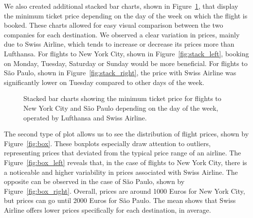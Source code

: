 We also created additional stacked bar charts, shown in Figure~\ref{fig:stacked}, that display the minimum ticket price depending on the day of the week on which the flight is booked.
These charts allowed for easy visual comparison between the two companies for each destination.
We observed a clear variation in prices, mainly due to Swiss Airline, which tends to increase or decrease its prices more than Lufthansa.
For flights to New York City, shown in Figure~\ref{fig:stack_left}, booking on Monday, Tuesday, Saturday or Sunday would be more beneficial.
For flights to São Paulo, shown in Figure~\ref{fig:stack_right}, the price with Swiss Airline was significantly lower on Tuesday compared to other days of the week.
\begin{figure}
    \centering
    \caption{Stacked bar charts showing the minimum ticket price for flights to New York City and São Paulo depending on the day of the week, operated by Lufthansa and Swiss Airline.}
    \label{fig:stacked}
\end{figure}

The second type of plot allows us to see the distribution of flight prices, shown by Figure~\ref{fig:box}.
These boxplots especially draw attention to outliers, representing prices that deviated from the typical price range of an airline.
The Figure~\ref{fig:box_left} reveals that, in the case of flights to New York City, there is a noticeable and higher variability in prices associated with Swiss Airline.
The opposite can be observed in the case of São Paulo, shown by Figure~\ref{fig:box_right}. Overall, prices are around 1000 Euros for New York City, but prices can go until 2000 Euros for São Paulo.
The mean shows that Swiss Airline offers lower prices specifically for each destination, in average.

